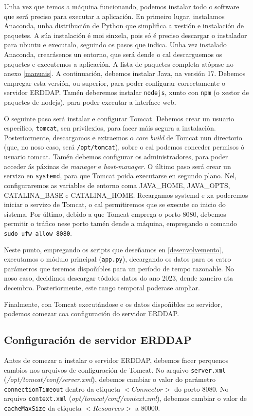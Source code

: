 Unha vez que temos a máquina funcionando, podemos instalar todo o software que será preciso para executar a aplicación. En primeiro lugar, instalamos Anaconda, unha distribución de Python que
simplifica a xestión e instalación de paquetes. A súa instalación é moi sinxela, pois só é preciso descargar o instalador para ubuntu e executalo, seguindo os pasos que indica. Unha vez instalado
Anaconda, crearásenos un entorno, que será dende o cal descarguemos os paquetes e executemos a aplicación. A lista de paquetes completa atópase no anexo \ref{manuais}. A continuación, debemos
instalar Java, na versión 17. Debemos empregar esta versión, ou superior, para poder configurar correctamente o servidor ERDDAP. Tamén deberemos instalar \texttt{nodejs}, xunto con \texttt{npm} (o
xestor de paquetes de nodejs), para poder executar a interface web.

O seguinte paso será instalar e configurar Tomcat. Debemos crear un usuario específico, \texttt{tomcat}, sen privilexios, para facer máis segura a instalación. Posteriormente, descargamos e
extraemos o \textit{core build} de Tomcat nun directorio (que, no noso caso, será \texttt{/opt/tomcat}), sobre o cal podemos conceder permisos ó usuario tomcat. Tamén debemos configurar os
administradores, para poder acceder ás páxinas de \textit{manager} e \textit{host-manager}. O último paso será crear un servizo en \texttt{systemd}, para que Tomcat poida executarse en segundo plano.
Nel, configuraremos as variables de entorno coma JAVA\_HOME, JAVA\_OPTS, CATALINA\_BASE e CATALINA\_HOME. Recargamos systemd e xa poderemos iniciar o servizo de Tomcat, o cal permitiremos que se
execute co inicio do sistema. Por último, debido a que Tomcat emprega o porto 8080, debemos permitir o tráfico nese porto tamén dende a máquina, empregando o comando \texttt{sudo ufw allow 8080}.

Neste punto, empregando os scripts que deseñamos en \ref{desenvolvemento}, executamos o módulo principal (\texttt{app.py}), decargando os datos para os catro parámetros que teremos dispoñibles para
un período de tempo razonable. No noso caso, decidimos descargar tódolos datos do ano 2023, dende xaneiro ata decembro. Posteriormente, este rango temporal poderase ampliar.

Finalmente, con Tomcat executándose e os datos dispoñibles no servidor, podemos comezar coa configuración do servidor ERDDAP.


\subsection{Configuración de servidor ERDDAP}\label{erddapconf}
Antes de comezar a instalar o servidor ERDDAP, debemos facer perquenos cambios nos arquivos de configuración de Tomcat. No arquivo \texttt{server.xml} (\textit{/opt/tomcat/conf/server.xml}),
debemos cambiar o valor do parámetro \texttt{connectionTimeout} dentro da etiqueta $<Connector>$ do porto 8080. No arquivo \texttt{context.xml} (\textit{opt/tomcat/conf/context.xml}), debemos
cambiar o valor de \texttt{cacheMaxSize} da etiqueta $<Resources>$ a 80000.

